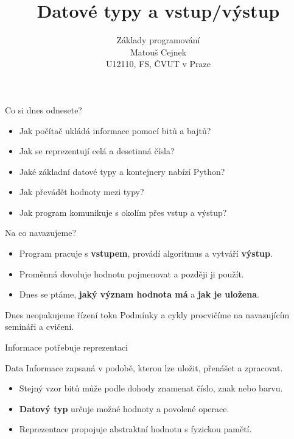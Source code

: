 \documentclass[aspectratio=169]{beamer}
\title{Datové typy a vstup/výstup}
\subtitle{Základy programování\\Matouš Cejnek\\U12110, FS, ČVUT v Praze}
\author{}
\institute{}
\date{}
\newcommand{\term}[1]{\textcolor{CodeBlue}{\textbf{#1}}}
\begin{document}
\begin{frame}
  \clearpage\thispagestyle{empty}\titlepage
\end{frame}

\begin{frame}{Co si dnes odnesete?}
  \begin{itemize}
    \item Jak počítač ukládá informace pomocí bitů a bajtů?
    \item Jak se reprezentují celá a desetinná čísla?
    \item Jaké základní datové typy a kontejnery nabízí Python?
    \item Jak převádět hodnoty mezi typy?
    \item Jak program komunikuje s okolím přes vstup a výstup?
  \end{itemize}
\end{frame}

\begin{frame}{Na co navazujeme?}
  \begin{itemize}
    \item Program pracuje s \term{vstupem}, provádí algoritmus a vytváří \term{výstup}.
    \item Proměnná dovoluje hodnotu pojmenovat a později ji použít.
    \item Dnes se ptáme, \textbf{jaký význam hodnota má} a \textbf{jak je uložena}.
  \end{itemize}
  \begin{alertblock}{Dnes neopakujeme řízení toku}
    Podmínky a cykly procvičíme na navazujícím semináři a cvičení.
  \end{alertblock}
\end{frame}

\begin{frame}{Informace potřebuje reprezentaci}
  \begin{block}{Data}
    Informace zapsaná v podobě, kterou lze uložit, přenášet a zpracovat.
  \end{block}
  \begin{itemize}
    \item Stejný vzor bitů může podle dohody znamenat číslo, znak nebo barvu.
    \item \term{Datový typ} určuje možné hodnoty a povolené operace.
    \item Reprezentace propojuje abstraktní hodnotu s fyzickou pamětí.
  \end{itemize}
\end{frame}
\end{document}
